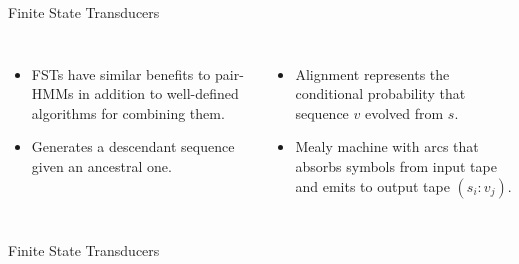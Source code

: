 \documentclass[aspectratio=169,font=14pt]{beamer}
\begin{document}
\begin{frame}{Finite State Transducers} %
\begin{columns}
    \vspace{1em}
    \begin{itemize}
        \setlength\itemsep{0.75em}
        \item FSTs have similar benefits to pair-HMMs in addition to well-defined algorithms for combining them.
        \item Generates a descendant sequence given an ancestral one.
    \end{itemize}
    \begin{itemize}
        \setlength\itemsep{0.75em}
        \item Alignment represents the conditional probability that sequence $v$ evolved from $s$.
        \item Mealy machine with arcs that absorbs symbols from input tape and emits to output tape $(s_i:v_j)$.
    \end{itemize}
\end{columns}
\vfill
\centering
\hspace*{-3em}\resizebox{0.8\textwidth}{!}{}
\end{frame} %

\begin{frame}[c]{Finite State Transducers} %
\vspace{1em}
{\centering






}
\end{frame} %
\end{document}
